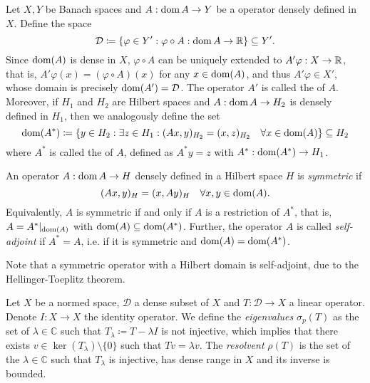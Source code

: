 \begin{definition}
    Let $X, Y$ be Banach spaces and $A:\operatorname{\text{dom}} A \to Y$ be a operator densely defined in $X$. Define the space
    \begin{equation*}
        \mathcal{D}  \coloneqq  \{\varphi\in Y': \varphi\circ A:\operatorname{\text{dom}} A\to \mathbb{R} \}\subseteq Y'.
    \end{equation*}
    Since $\operatorname{\text{dom}}(A)$ is dense in $X$, $\varphi\circ A$ can be uniquely extended to $A'\varphi:X\to \mathbb{R}$, that is, $A'\varphi(x) = (\varphi\circ A)(x)$ for any $x\in\operatorname{\text{dom}}(A)$, and thus $A'\varphi\in X'$, whose domain is precisely $\operatorname{\text{dom}}(A') = \mathcal{D}$. The operator $A'$ is called the  of $A$. Moreover, if $H_1$ and $H_2$ are Hilbert spaces and $A:\operatorname{\text{dom}} A\to H_2$ is densely defined in $H_1$, then we analogously define the set 
    \begin{equation*}
        \operatorname{\text{dom}}(A^*)  \coloneqq  \{y\in H_2: \exists z\in H_1: (Ax,y)_{H_2} = (x,z)_{H_2}\quad \forall x\in\operatorname{\text{dom}}(A)\}\subseteq H_2
    \end{equation*}
    where $A^*$ is called the  of $A$, defined as $A^*y = z$ with $A^*:\operatorname{\text{dom}}(A^*)\to H_1$.
\end{definition}
\begin{definition}
    An operator $A:\operatorname{\text{dom}} A\to H$ densely defined in a Hilbert space $H$ is \textit{symmetric} if 
    \begin{equation*}
        (Ax,y)_H = (x,Ay)_H \quad \forall x,y\in\operatorname{\text{dom}}(A).
    \end{equation*}
    Equivalently, $A$ is symmetric if and only if $A$ is a restriction of $A^*$, that is, $A=A^*|_{\operatorname{\text{dom}}(A)}$ with $\operatorname{\text{dom}}(A)\subseteq \operatorname{\text{dom}}(A^*)$. Further, the operator $A$ is called \textit{self-adjoint} if $A^*=A$, i.e. if it is symmetric and $\operatorname{\text{dom}}(A) = \operatorname{\text{dom}}(A^*)$.  
\end{definition}
Note that a symmetric operator with a Hilbert domain is self-adjoint, due to the Hellinger-Toeplitz theorem.

\begin{definition} 
    Let $X$ be a normed space, $\mathcal{D}$ a dense subset of $X$ and $T:\mathcal{D}\to X$ a linear operator. Denote $I:X\to X$ the identity operator. We define the \textit{eigenvalues} $\sigma_p(T)$ as the set of $\lambda\in\mathbb{C}$ such that $T_\lambda  \coloneqq  T - \lambda I$ is not injective, which implies that there exists $v\in \ker(T_\lambda)\setminus \{0\}$ such that $Tv=\lambda v$. The \textit{resolvent} $\rho(T)$ is the set of the $\lambda\in\mathbb{C}$ such that $T_\lambda$ is injective, has dense range in $X$ and its inverse is bounded.
\end{definition}

